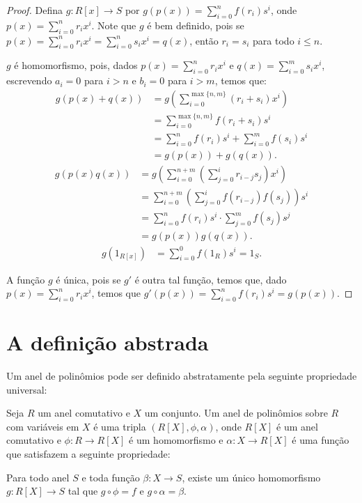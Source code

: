 \begin{proof}
    Defina $g:R[x]\rightarrow S$ por $g(p(x))=\sum_{i=0}^n f(r_i)s^i$, onde $p(x)=\sum_{i=0}^n r_ix^i$.
    Note que $g$ é bem definido, pois se $p(x)=\sum_{i=0}^n r_ix^i=\sum_{i=0}^n s_ix^i=q(x)$, então $r_i=s_i$ para todo $i\leq n$.

    $g$ é homomorfismo, pois, dados $p(x)=\sum_{i=0}^n r_ix^i$ e $q(x)=\sum_{i=0}^m s_ix^i$, escrevendo $a_i=0$ para $i>n$ e $b_i=0$ para $i>m$, temos que:
    \begin{align*}
        g(p(x)+q(x))&=g\left(\sum_{i=0}^{\max\{n, m\}}(r_i+s_i)x^i\right)\\
        &=\sum_{i=0}^{\max\{n, m\}}f(r_i+s_i)s^i\\
        &=\sum_{i=0}^{n}f(r_i)s^i+\sum_{i=0}^{m}f(s_i)s^i\\
        &=g(p(x))+g(q(x)).
    \end{align*}
    \begin{align*}
        g(p(x)q(x))&=g\left(\sum_{i=0}^{n+m}\left(\sum_{j=0}^i r_{i-j}s_j\right)x^i\right)\\
        &=\sum_{i=0}^{n+m}\left(\sum_{j=0}^i f(r_{i-j})f(s_j)\right)s^i\\
        &=\sum_{i=0}^{n}f(r_i)s^i\cdot \sum_{j=0}^m f(s_j)s^j\\
        &=g(p(x))g(q(x)).
    \end{align*}
    \begin{align*}
        g(1_{R[x]})
        &=\sum_{i=0}^0 f(1_R)s^i=1_S.
    \end{align*}

    A função $g$ é única, pois se $g'$ é outra tal função, temos que, dado $p(x)=\sum_{i=0}^n r_ix^i$, temos que $g'(p(x))=\sum_{i=0}^nf(r_i)s^i=g(p(x))$.
\end{proof}

\section{A definição abstrada}
Um anel de polinômios pode ser definido abstratamente pela seguinte propriedade universal:

\begin{definition}
Seja $R$ um anel comutativo e $X$ um conjunto.
Um anel de polinômios sobre $R$ com variáveis em $X$ é uma tripla $(R[X], \phi, \alpha)$, onde $R[X]$ é um anel comutativo e $\phi:R\rightarrow R[X]$ é um homomorfismo e $\alpha:X\rightarrow R[X]$ é uma função que satisfazem a seguinte propriedade:

Para todo anel $S$ e toda função $\beta:X\rightarrow S$, existe um único homomorfismo $g:R[X]\rightarrow S$ tal que $g\circ \phi=f$ e $g\circ \alpha=\beta$.
\end{definition}

